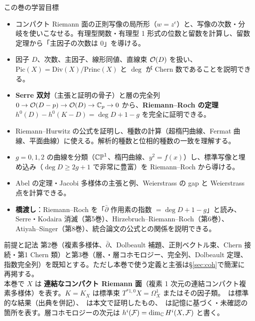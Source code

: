 \begin{goalbox}{この巻の学習目標}
\begin{itemize}
\item コンパクト Riemann 面の正則写像の局所形（$w=z^e$）と、写像の次数・分岐を使いこなせる。有理型関数・有理型 1 形式の位数と留数を計算し、留数定理から「主因子の次数は $0$」を導ける。
\item 因子 $D$、次数、主因子、線形同値、直線束 $\mathcal O(D)$ を扱い、$\mathrm{Pic}(X)=\mathrm{Div}(X)/\mathrm{Princ}(X)$ と $\deg$ が Chern 数であることを説明できる。
\item \textbf{Serre 双対}（主張と証明の骨子）と層の完全列 $0\to\mathcal O(D-p)\to\mathcal O(D)\to\mathbb C_p\to0$ から、\textbf{Riemann--Roch の定理} $h^0(D)-h^0(K-D)=\deg D+1-g$ を完全に証明できる。
\item Riemann--Hurwitz の公式を証明し、種数の計算（超楕円曲線、Fermat 曲線、平面曲線）に使える。解析的種数と位相的種数の一致を理解する。
\item $g=0,1,2$ の曲線を分類（$\mathbb{CP}^1$、楕円曲線、$y^2=f(x)$）し、標準写像と埋め込み（$\deg D\ge2g+1$ で非常に豊富）を Riemann--Roch から導ける。
\item Abel の定理・Jacobi 多様体の主張と例、Weierstrass の gap と Weierstrass 点を計算できる。
\item \textbf{橋渡し}：Riemann--Roch を「$\bar\partial$ 作用素の指数 $=\deg D+1-g$」と読み、Serre・Kodaira 消滅（第5巻）、Hirzebruch--Riemann--Roch（第6巻）、Atiyah--Singer（第8巻）、統合論文の公式との関係を説明できる。
\end{itemize}
\end{goalbox}
\begin{goalbox}{前提と記法}
第2巻（複素多様体、$\bar\partial$、Dolbeault 補題、正則ベクトル束、Chern 接続・第1 Chern 類）と第3巻（層、\Cech{}・層コホモロジー、完全列、Dolbeault 定理、指数完全列）を既知とする。ただし本巻で使う定義と主張は\S\ref{sec:coh}で簡潔に再掲する。\\
本巻で $X$ は \textbf{連結なコンパクト Riemann 面}（複素 1 次元の連結コンパクト複素多様体）を表す。$K=K_X$ は標準束 $T^{*1,0}X=\Omega^1_X$ またはその因子類。\tC\ は標準的な結果（出典を併記）、\tP\ は本文で証明したもの、\tQ\ は記憶に基づく・未確認の箇所を表す。層コホモロジーの次元は $h^i(\mathcal F)=\dim_{\mathbb C}H^i(X,\mathcal F)$ と書く。
\end{goalbox}
\tableofcontents
\newpage
